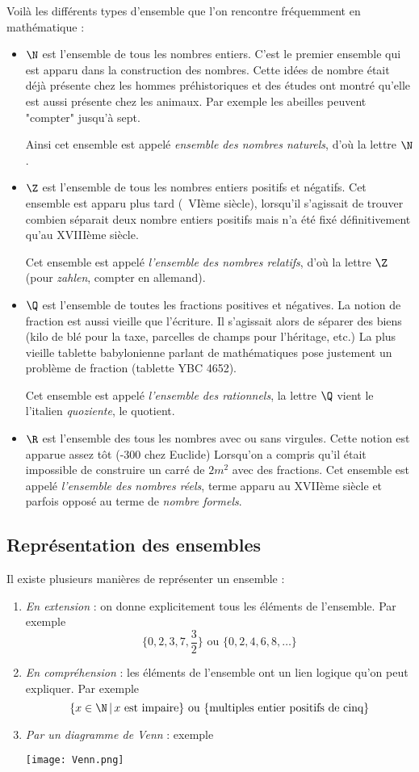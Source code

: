 Voilà les différents types d'ensemble que l'on rencontre fréquemment en mathématique :
\begin{itemize}
\item $\N$ est l'ensemble de tous les nombres entiers. C'est le premier ensemble qui est apparu dans la construction des nombres. Cette idées de nombre était déjà présente chez les hommes préhistoriques et des études ont montré qu'elle est aussi présente chez les animaux. Par exemple les abeilles peuvent "compter" jusqu'à sept.

Ainsi cet ensemble est appelé \emph{ensemble des nombres naturels}, d'où la lettre $\N$.
\item $\Z$ est l'ensemble de tous les nombres entiers positifs et négatifs. Cet ensemble est apparu plus tard (~VIème siècle), lorsqu'il s'agissait de trouver combien séparait deux nombre entiers positifs mais n'a été fixé définitivement qu'au XVIIIème siècle. 

Cet ensemble est appelé \emph{l'ensemble des nombres relatifs}, d'où la lettre $\Z$ (pour \textit{zahlen}, compter en allemand).
\item $\Q$ est l'ensemble de toutes les fractions positives et négatives. La notion de fraction est aussi vieille que l'écriture. Il s'agissait alors de séparer des biens (kilo de blé pour la taxe, parcelles de champs pour l'héritage, etc.) La plus vieille tablette babylonienne parlant de mathématiques pose justement un problème de fraction (tablette YBC 4652). 

Cet ensemble est appelé \emph{l'ensemble des rationnels}, la lettre $\Q$ vient le l'italien \textit{quoziente}, le quotient.
\item $\R$ est l'ensemble des tous les nombres avec ou sans virgules. Cette notion est apparue assez tôt (-300 chez Euclide) Lorsqu'on a compris qu'il était impossible de construire un carré de $2m^2$ avec des fractions. Cet ensemble est appelé \emph{l'ensemble des nombres réels}, terme apparu au XVIIème siècle et parfois opposé au terme de \emph{nombre formels}.
\end{itemize}

\subsection{Représentation des ensembles}

Il existe plusieurs manières de représenter un ensemble :
\begin{enumerate}
\item \emph{En extension} : on donne explicitement tous les éléments de l'ensemble. Par exemple
$$
\{0,2,3,7,\frac{3}{2}\} \mbox{ ou } \{0,2,4,6,8,\dots\}
$$
\item \emph{En compréhension} : les éléments de l'ensemble ont un lien logique qu'on peut expliquer. Par exemple 
$$
\{x\in \N \, | \, x \mbox{ est impaire}\} \mbox{ ou } \{\mbox{multiples entier positifs de cinq}\}
$$
\item \emph{Par un diagramme de Venn} : exemple
\begin{center}
\texttt{[image: Venn.png]}
\end{center}
\end{enumerate}

